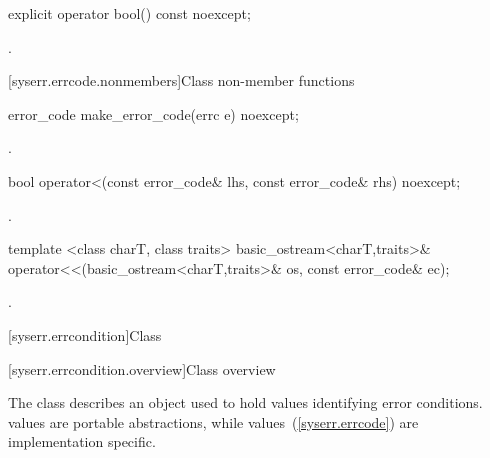 \begin{itemdecl}
explicit operator bool() const noexcept;
\end{itemdecl}

\begin{itemdescr}
\pnum
\returns {}.
\end{itemdescr}

[syserr.errcode.nonmembers]{Class  non-member functions}

\begin{itemdecl}
error_code make_error_code(errc e) noexcept;
\end{itemdecl}

\begin{itemdescr}
\pnum
\returns {}.
\end{itemdescr}

%
%
\begin{itemdecl}
bool operator<(const error_code& lhs, const error_code& rhs) noexcept;
\end{itemdecl}

\begin{itemdescr}
\pnum
\returns {}.
\end{itemdescr}

%
%
\begin{itemdecl}
template <class charT, class traits>
  basic_ostream<charT,traits>&
    operator<<(basic_ostream<charT,traits>& os, const error_code& ec);
\end{itemdecl}

\begin{itemdescr}
\pnum
\effects {}.
\end{itemdescr}


[syserr.errcondition]{Class }

[syserr.errcondition.overview]{Class  overview}

\pnum
The class  describes an object used to hold values identifying
error conditions. \enternote {} values are portable abstractions,
while  values~(\ref{syserr.errcode}) are implementation specific. \exitnote

